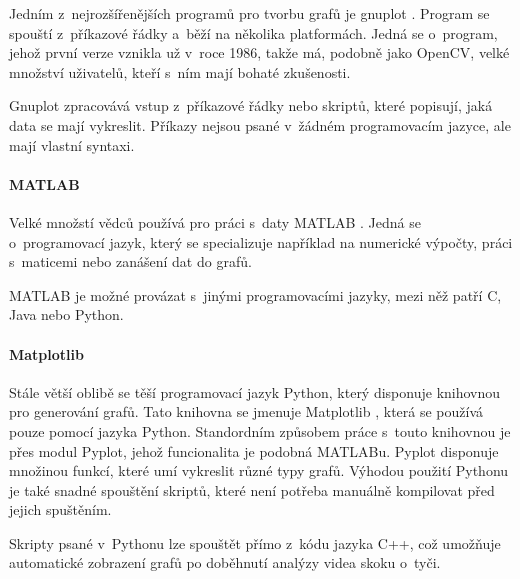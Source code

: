 Jedním z~nejrozšířenějších programů pro tvorbu grafů je gnuplot \citep{gnuplot}. Program se spouští z~příkazové řádky a~běží na několika platformách. Jedná se o~program, jehož první verze vznikla už v~roce 1986, takže má, podobně jako OpenCV, velké množství uživatelů, kteří s~ním mají bohaté zkušenosti.

Gnuplot zpracovává vstup z~příkazové řádky nebo skriptů, které popisují, jaká data se mají vykreslit. Příkazy nejsou psané v~žádném programovacím jazyce, ale mají vlastní syntaxi.

\paragraph{MATLAB}

Velké množstí vědců používá pro práci s~daty MATLAB \citep{MATLAB}. Jedná se o~programovací jazyk, který se specializuje například na numerické výpočty, práci s~maticemi nebo zanášení dat do grafů.

MATLAB je možné provázat s~jinými programovacími jazyky, mezi něž patří C, Java nebo Python.

\paragraph{Matplotlib}

Stále větší oblibě se těší programovací jazyk Python, který disponuje knihovnou pro generování grafů. Tato knihovna se jmenuje Matplotlib \citep{Matplotlib}, která se používá pouze pomocí jazyka Python. Standordním způsobem práce s~touto knihovnou je přes modul Pyplot, jehož funcionalita je podobná MATLABu. Pyplot disponuje množinou funkcí, které umí vykreslit různé typy grafů. Výhodou použití Pythonu je také snadné spouštění skriptů, které není potřeba manuálně kompilovat před jejich spuštěním.

Skripty psané v~Pythonu lze spouštět přímo z~kódu jazyka C++, což umožňuje automatické zobrazení grafů po doběhnutí analýzy videa skoku o~tyči.

































